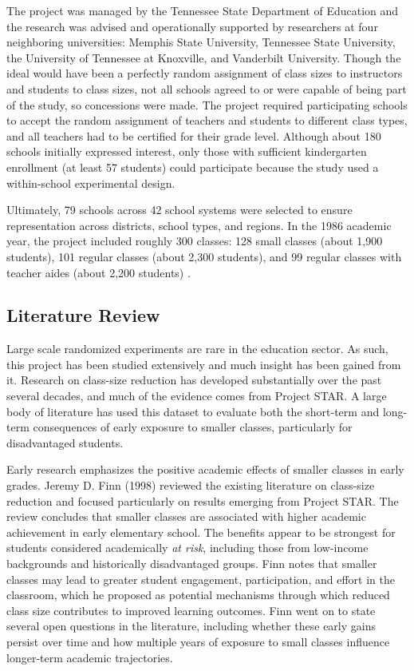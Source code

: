 \documentclass[11pt]{article}
\begin{document}
The project was managed by the Tennessee State Department of Education and the research was advised and operationally supported by researchers at four neighboring universities: Memphis State University, Tennessee State University, the University of Tennessee at Knoxville, and Vanderbilt University. Though the ideal would have been a perfectly random assignment of class sizes to instructors and students to class sizes, not all schools agreed to or were capable of being part of the study, so concessions were made. The project required participating schools to accept the random assignment of teachers and students to different class types, and all teachers had to be certified for their grade level. Although about 180 schools initially expressed interest, only those with sufficient kindergarten enrollment (at least 57 students) could participate because the study used a within-school experimental design.

Ultimately, 79 schools across 42 school systems were selected to ensure representation across districts, school types, and regions. In the 1986 academic year, the project included roughly 300 classes: 128 small classes (about 1,900 students), 101 regular classes (about 2,300 students), and 99 regular classes with teacher aides (about 2,200 students) \cite{achilles2008star}.

\subsection{Literature Review}
Large scale randomized experiments are rare in the education sector. As such, this project has been studied extensively and much insight has been gained from it. Research on class-size reduction has developed substantially over the past several decades, and much of the evidence comes from Project STAR. A large body of literature has used this dataset to evaluate both the short-term and long-term consequences of early exposure to smaller classes, particularly for disadvantaged students.

Early research emphasizes the positive academic effects of smaller classes in early grades. Jeremy D. Finn (1998) \cite{finn1998_class_size_students_risk} reviewed the existing literature on class-size reduction and focused particularly on results emerging from Project STAR. The review concludes that smaller classes are associated with higher academic achievement in early elementary school. The benefits appear to be strongest for students considered academically \emph{at risk}, including those from low-income backgrounds and historically disadvantaged groups. Finn notes that smaller classes may lead to greater student engagement, participation, and effort in the classroom, which he proposed as potential mechanisms through which reduced class size contributes to improved learning outcomes. Finn went on to state several open questions in the literature, including whether these early gains persist over time and how multiple years of exposure to small classes influence longer-term academic trajectories.
\end{document}
